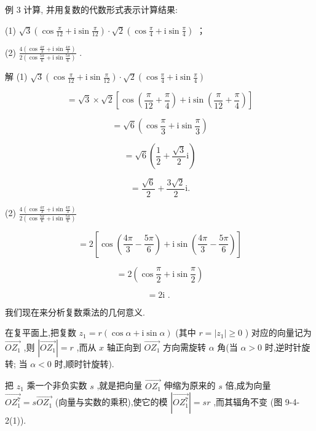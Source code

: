 \documentclass[10pt]{article}
\begin{document}
例 3 计算, 并用复数的代数形式表示计算结果:

(1) \(\sqrt{3}\left( {\cos \frac{\pi }{12} + \mathrm{i}\sin \frac{\pi }{12}}\right)  \cdot  \sqrt{2}\left( {\cos \frac{\pi }{4} + \mathrm{i}\sin \frac{\pi }{4}}\right)\) ；

(2) \(\frac{4\left( {\cos \frac{4\pi }{3} + \mathrm{i}\sin \frac{4\pi }{3}}\right) }{2\left( {\cos \frac{5\pi }{6} + \mathrm{i}\sin \frac{5\pi }{6}}\right) }\) .

解 (1) \(\sqrt{3}\left( {\cos \frac{\pi }{12} + \mathrm{i}\sin \frac{\pi }{12}}\right)  \cdot  \sqrt{2}\left( {\cos \frac{\pi }{4} + \mathrm{i}\sin \frac{\pi }{4}}\right)\)

\[
= \sqrt{3} \times  \sqrt{2}\left\lbrack  {\cos \left( {\frac{\pi }{12} + \frac{\pi }{4}}\right)  + \mathrm{i}\sin \left( {\frac{\pi }{12} + \frac{\pi }{4}}\right) }\right\rbrack
\]

\[
= \sqrt{6}\left( {\cos \frac{\pi }{3} + \mathrm{i}\sin \frac{\pi }{3}}\right)
\]

\[
= \sqrt{6}\left( {\frac{1}{2} + \frac{\sqrt{3}}{2}\mathrm{i}}\right)
\]

\[
= \frac{\sqrt{6}}{2} + \frac{3\sqrt{2}}{2}\mathrm{i}.
\]

(2) \(\frac{4\left( {\cos \frac{4\pi }{3} + \mathrm{i}\sin \frac{4\pi }{3}}\right) }{2\left( {\cos \frac{5\pi }{6} + \mathrm{i}\sin \frac{5\pi }{6}}\right) }\)

\[
= 2\left\lbrack  {\cos \left( {\frac{4\pi }{3} - \frac{5\pi }{6}}\right)  + \mathrm{i}\sin \left( {\frac{4\pi }{3} - \frac{5\pi }{6}}\right) }\right\rbrack
\]

\[
= 2\left( {\cos \frac{\pi }{2} + \mathrm{i}\sin \frac{\pi }{2}}\right)
\]

\[
= 2\mathrm{i}\text{ . }
\]

我们现在来分析复数乘法的几何意义.

在复平面上,把复数 \({z}_{1} = r\left( {\cos \alpha  + \mathrm{i}\sin \alpha }\right)\) (其中 \(r = \left| {z}_{1}\right|  \geq  0\) ) 对应的向量记为 \(\overrightarrow{O{Z}_{1}}\) ,则 \(\left| \overrightarrow{O{Z}_{1}}\right|  = r\) ,而从 \(x\) 轴正向到 \(\overrightarrow{O{Z}_{1}}\) 方向需旋转 \(\alpha\) 角(当 \(\alpha  > 0\) 时,逆时针旋转; 当 \(\alpha  < 0\) 时,顺时针旋转).

把 \({z}_{1}\) 乘一个非负实数 \(s\) ,就是把向量 \(\overrightarrow{O{Z}_{1}}\) 伸缩为原来的 \(s\) 倍,成为向量 \(\overrightarrow{O{Z}_{1}^{7}} = s\overrightarrow{O{Z}_{1}}\) (向量与实数的乘积),使它的模 \(\left| \overrightarrow{O{Z}_{1}^{7}}\right|  = {sr}\) ,而其辐角不变 (图 9-4-2(1)).
\end{document}
